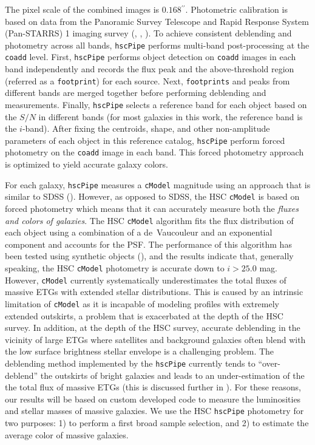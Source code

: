 \documentclass[a4paper,fleqn,usenatbib]{mnras}
\def\asec{$^{\prime\prime}$}
\def\cmodel{\texttt{cModel}}
\begin{document}
    The pixel scale of the combined images is $0.168$\asec{}. 
    Photometric calibration is based on data from the Panoramic Survey Telescope 
    and Rapid Response System (Pan-STARRS) 1 imaging survey 
    (\citealt{Schlafly2012}, \citealt{Tonry2012}, \citealt{Magnier2013}). 
    To achieve consistent deblending and photometry across all bands, \texttt{hscPipe} 
    performs multi-band post-processing at the \texttt{coadd} level. 
    First, \texttt{hscPipe} performs object detection on \texttt{coadd} images in 
    each band independently and records the flux peak and the above-threshold region 
    (referred as a \texttt{footprint}) for each source. 
    Next, \texttt{footprints} and peaks from different bands are merged together before     
    performing deblending and measurements. 
    Finally, \texttt{hscPipe} selects a reference band for each object based on the 
    $S/N$ in different bands (for most galaxies in this work, the reference band is 
    the $i$-band). 
    After fixing the centroids, shape, and other non-amplitude parameters of each 
    object in this reference catalog, \texttt{hscPipe} perform forced photometry 
    on the \texttt{coadd} image in each band. 
    This forced photometry approach is optimized to yield accurate galaxy colors. 
       
    For each galaxy, \texttt{hscPipe} measures a \cmodel{} magnitude using an approach 
    that is similar to SDSS (\citealt{Bosch2017}). 
    However, as opposed to SDSS, the HSC \cmodel{} is based on forced photometry which 
    means that it can accurately measure both the \textit{fluxes and colors of galaxies}. 
    The HSC \cmodel{} algorithm fits the flux distribution of each object using a 
    combination of a de~Vaucouleur and an exponential component and accounts for the PSF. 
    The performance of this algorithm has been tested using synthetic objects 
    (\citealt{SynPipe}), and the results indicate that, generally speaking, 
    the HSC \cmodel{} photometry is accurate down to $i >25.0$ mag.  
    However, \cmodel{} currently systematically underestimates the total fluxes of 
    massive ETGs with extended stellar distributions. 
    This is caused by an intrinsic limitation of \cmodel{} as it is incapable of
    modeling profiles with extremely extended outskirts, a problem that is exacerbated 
    at the depth of the HSC survey. 
    In addition, at the depth of the HSC survey, accurate deblending in the vicinity of
    large ETGs where satellites and background galaxies often blend with the low surface 
    brightness stellar envelope is a challenging problem. 
    The deblending method implemented by the \texttt{hscPipe} currently tends to 
    ``over-deblend'' the outskirts of bright galaxies and leads to an 
    under-estimation of the the total flux of massive ETGs (this is discussed further in 
    \citealt{Bosch2017}).  
    For these reasons, our results will be based on custom developed code to measure 
    the luminosities and stellar masses of massive galaxies. 
    We use the HSC \texttt{hscPipe} photometry for two purposes: 
    1) to perform a first broad sample selection, and 2) to estimate the average 
    color of massive galaxies.
\end{document}
